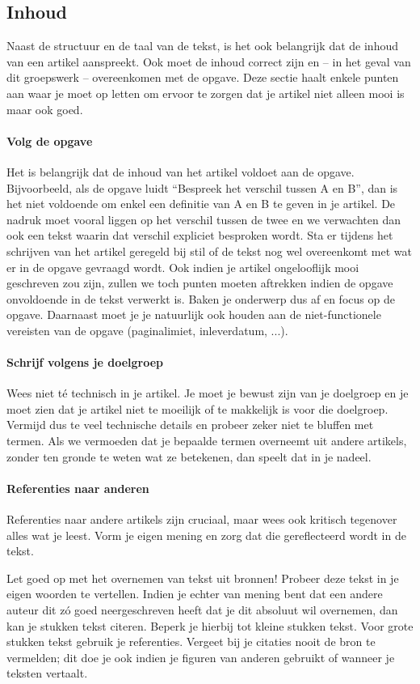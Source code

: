 \documentclass[a4paper]{article}
\begin{document}
\subsection{Inhoud}

Naast de structuur en de taal van de tekst, is het ook belangrijk dat de inhoud van een artikel aanspreekt.
Ook moet de inhoud correct zijn en -- in het geval van dit groepswerk -- overeenkomen met de opgave.
Deze sectie haalt enkele punten aan waar je moet op letten om ervoor te zorgen dat je artikel niet alleen mooi is maar ook goed.


\paragraph{Volg de opgave}

Het is belangrijk dat de inhoud van het artikel voldoet aan de opgave.
Bijvoorbeeld, als de opgave luidt ``Bespreek het verschil tussen A en B'', dan is het niet voldoende om enkel een definitie van A en B te geven in je artikel.
De nadruk moet vooral liggen op het verschil tussen de twee en we verwachten dan ook een tekst waarin dat verschil expliciet besproken wordt.
Sta er tijdens het schrijven van het artikel geregeld bij stil of de tekst nog wel overeenkomt met wat er in de opgave gevraagd wordt.
Ook indien je artikel ongelooflijk mooi geschreven zou zijn, zullen we toch punten moeten aftrekken indien de opgave onvoldoende in de tekst verwerkt is.
Baken je onderwerp dus af en focus op de opgave.
Daarnaast moet je je natuurlijk ook houden aan de niet-functionele vereisten van de opgave (paginalimiet, inleverdatum, ...).


\paragraph{Schrijf volgens je doelgroep}

Wees niet t\'e technisch in je artikel.
Je moet je bewust zijn van je doelgroep en je moet zien dat je artikel niet te moeilijk of te makkelijk is voor die doelgroep.
Vermijd dus te veel technische details en probeer zeker niet te bluffen met termen.
Als we vermoeden dat je bepaalde termen overneemt uit andere artikels, zonder ten gronde te weten wat ze betekenen, dan speelt dat in je nadeel.


\paragraph{Referenties naar anderen}

Referenties naar andere artikels zijn cruciaal, maar wees ook kritisch tegenover alles wat je leest.
Vorm je eigen mening en zorg dat die gereflecteerd wordt in de tekst.

Let goed op met het overnemen van tekst uit bronnen!
Probeer deze tekst in je eigen woorden te vertellen.
Indien je echter van mening bent dat een andere auteur dit z\'o goed neergeschreven heeft dat je dit absoluut wil overnemen, dan kan je stukken tekst citeren.
Beperk je hierbij tot kleine stukken tekst.
Voor grote stukken tekst gebruik je referenties.
Vergeet bij je citaties nooit de bron te vermelden; dit doe je ook indien je figuren van anderen gebruikt of wanneer je teksten vertaalt.



\end{document}
